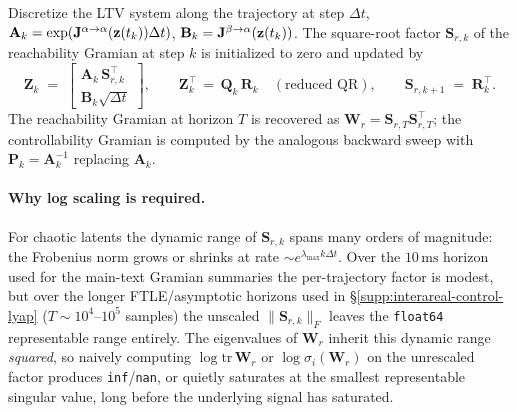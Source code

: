 Discretize the LTV system along the trajectory at step $\Delta t$, $\mathbf{A}_{k}=\exp(\mathbf{J}^{\alpha\to\alpha}(\vb{z}(t_{k}))\Delta t)$, $\mathbf{B}_{k}=\mathbf{J}^{\beta\to\alpha}(\vb{z}(t_{k}))$. The square-root factor $\mathbf{S}_{r,k}$ of the reachability Gramian at step $k$ is initialized to zero and updated by
\begin{equation}
\mathbf{Z}_{k} \;=\; \begin{bmatrix}\mathbf{A}_{k}\,\mathbf{S}_{r,k}^{\!\top}\\ \mathbf{B}_{k}\sqrt{\Delta t}\end{bmatrix},\qquad \mathbf{Z}_{k}^{\!\top}\,=\,\mathbf{Q}_{k}\,\mathbf{R}_{k}\quad(\text{reduced QR}),\qquad \mathbf{S}_{r,k+1}\;=\;\mathbf{R}_{k}^{\!\top}.
\end{equation}
The reachability Gramian at horizon $T$ is recovered as $\mathbf{W}_{r}=\mathbf{S}_{r,T}\mathbf{S}_{r,T}^{\!\top}$; the controllability Gramian is computed by the analogous backward sweep with $\mathbf{P}_{k}=\mathbf{A}_{k}^{-1}$ replacing $\mathbf{A}_{k}$.

\paragraph{Why log scaling is required.}
For chaotic latents the dynamic range of $\mathbf{S}_{r,k}$ spans many orders of magnitude: the Frobenius norm grows or shrinks at rate $\sim e^{\lambda_{\max} k\Delta t}$. Over the $10\,\mathrm{ms}$ horizon used for the main-text Gramian summaries the per-trajectory factor is modest, but over the longer FTLE/asymptotic horizons used in \S\ref{supp:interareal-control-lyap} ($T\sim 10^{4}$--$10^{5}$ samples) the unscaled $\|\mathbf{S}_{r,k}\|_{F}$ leaves the \texttt{float64} representable range entirely. The eigenvalues of $\mathbf{W}_{r}$ inherit this dynamic range \emph{squared}, so naively computing $\log\mathrm{tr}\,\mathbf{W}_{r}$ or $\log\sigma_{i}(\mathbf{W}_{r})$ on the unrescaled factor produces \texttt{inf}/\texttt{nan}, or quietly saturates at the smallest representable singular value, long before the underlying signal has saturated.


